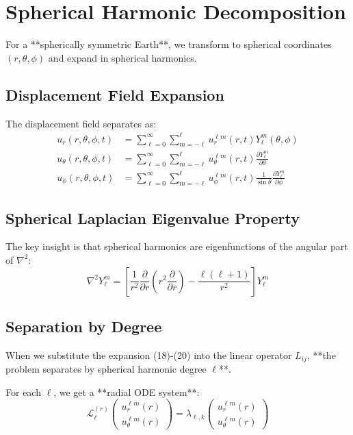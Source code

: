 \documentclass{article}
\begin{document}
\section{Spherical Harmonic Decomposition}

For a **spherically symmetric Earth**, we transform to spherical coordinates $(r,\theta,\phi)$ and expand in spherical harmonics.

\subsection{Displacement Field Expansion}

The displacement field separates as:
\begin{align}
u_r(r,\theta,\phi,t) &= \sum_{\ell=0}^{\infty} \sum_{m=-\ell}^{\ell} u_r^{\ell m}(r,t) Y_\ell^m(\theta,\phi) \\
u_\theta(r,\theta,\phi,t) &= \sum_{\ell=0}^{\infty} \sum_{m=-\ell}^{\ell} u_\theta^{\ell m}(r,t) \frac{\partial Y_\ell^m}{\partial \theta} \\
u_\phi(r,\theta,\phi,t) &= \sum_{\ell=0}^{\infty} \sum_{m=-\ell}^{\ell} u_\phi^{\ell m}(r,t) \frac{1}{\sin\theta}\frac{\partial Y_\ell^m}{\partial \phi}
\end{align}

\subsection{Spherical Laplacian Eigenvalue Property}

The key insight is that spherical harmonics are eigenfunctions of the angular part of $\nabla^2$:
\begin{equation}
\nabla^2 Y_\ell^m = \left[\frac{1}{r^2}\frac{\partial}{\partial r}\left(r^2\frac{\partial}{\partial r}\right) - \frac{\ell(\ell+1)}{r^2}\right] Y_\ell^m
\end{equation}

\subsection{Separation by Degree}

When we substitute the expansion (18)-(20) into the linear operator $L_{ij}$, **the problem separates by spherical harmonic degree $\ell$**.

For each $\ell$, we get a **radial ODE system**:
\begin{equation}
\mathcal{L}_\ell^{(r)} \begin{pmatrix} u_r^{\ell m}(r) \\ u_\theta^{\ell m}(r) \end{pmatrix} = \lambda_{\ell,k} \begin{pmatrix} u_r^{\ell m}(r) \\ u_\theta^{\ell m}(r) \end{pmatrix}
\end{equation}
\end{document}
